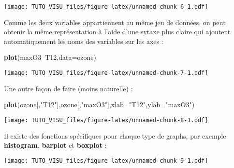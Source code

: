 \documentclass[]{book}
\newenvironment{Shaded}{\begin{snugshade}}{\end{snugshade}}
\newcommand{\DataTypeTok}[1]{\textcolor[rgb]{0.13,0.29,0.53}{#1}}
\newcommand{\KeywordTok}[1]{\textcolor[rgb]{0.13,0.29,0.53}{\textbf{#1}}}
\newcommand{\NormalTok}[1]{#1}
\newcommand{\OperatorTok}[1]{\textcolor[rgb]{0.81,0.36,0.00}{\textbf{#1}}}
\newcommand{\StringTok}[1]{\textcolor[rgb]{0.31,0.60,0.02}{#1}}
\theoremstyle{definition}
\theoremstyle{definition}
\theoremstyle{definition}
\theoremstyle{remark}
\begin{document}
\texttt{[image: TUTO\_VISU\_files/figure-latex/unnamed-chunk-6-1.pdf]}

Comme les deux variables appartiennent au même jeu de données, on peut obtenir la même représentation à l'aide d'une sytaxe plus claire qui ajoutent automatiquement les noms des variables sur les axes :

\begin{Shaded}
\begin{Highlighting}[]
\KeywordTok{plot}\NormalTok{(maxO3}\OperatorTok{~}\NormalTok{T12,}\DataTypeTok{data=}\NormalTok{ozone)}
\end{Highlighting}
\end{Shaded}

\texttt{[image: TUTO\_VISU\_files/figure-latex/unnamed-chunk-7-1.pdf]}

Une autre façon de faire (moins naturelle) :

\begin{Shaded}
\begin{Highlighting}[]
\KeywordTok{plot}\NormalTok{(ozone[,}\StringTok{"T12"}\NormalTok{],ozone[,}\StringTok{"maxO3"}\NormalTok{],}\DataTypeTok{xlab=}\StringTok{"T12"}\NormalTok{,}\DataTypeTok{ylab=}\StringTok{"maxO3"}\NormalTok{)}
\end{Highlighting}
\end{Shaded}

\texttt{[image: TUTO\_VISU\_files/figure-latex/unnamed-chunk-8-1.pdf]}

Il existe des fonctions spécifiques pour chaque type de graphs, par exemple \textbf{histogram}, \textbf{barplot} et \textbf{boxplot} :

\begin{Shaded}
\end{Shaded}

\texttt{[image: TUTO\_VISU\_files/figure-latex/unnamed-chunk-9-1.pdf]}

\begin{Shaded}
\end{Shaded}
\end{document}
